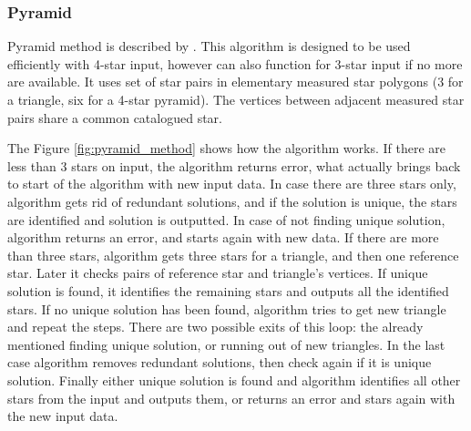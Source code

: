 \documentclass[12pt,a4paper,oneside]{article}
\begin{document}
\subsubsection{Pyramid}

Pyramid method is described by \citet{mortari2004pyramid}. This algorithm is designed to be used efficiently with 4-star input, however can also function for 3-star input if no more are available. It uses set of star pairs in elementary measured star polygons (3 for a triangle, six for a 4-star pyramid). The vertices between adjacent measured star pairs share a common catalogued star.

The Figure \ref{fig:pyramid_method} shows how the algorithm works. If there are less than 3 stars on input, the algorithm returns error, what actually brings back to start of the algorithm with new input data. In case there are three stars only, algorithm gets rid of redundant solutions, and if the solution is unique, the stars are identified and solution is outputted. In case of not finding unique solution, algorithm returns an error, and starts again with new data. If there are more than three stars, algorithm gets three stars for a triangle, and then one reference star. Later it checks pairs of reference star and triangle's vertices. If unique solution is found, it identifies the remaining stars and outputs all the identified stars. If no unique solution has been found, algorithm tries to get new triangle and repeat the steps. There are two possible exits of this loop: the already mentioned finding unique solution, or running out of new triangles. In the last case algorithm removes redundant solutions, then check again if it is unique solution. Finally either unique solution is found and algorithm identifies all other stars from the input and outputs them, or returns an error and stars again with the new input data.
\end{document}

